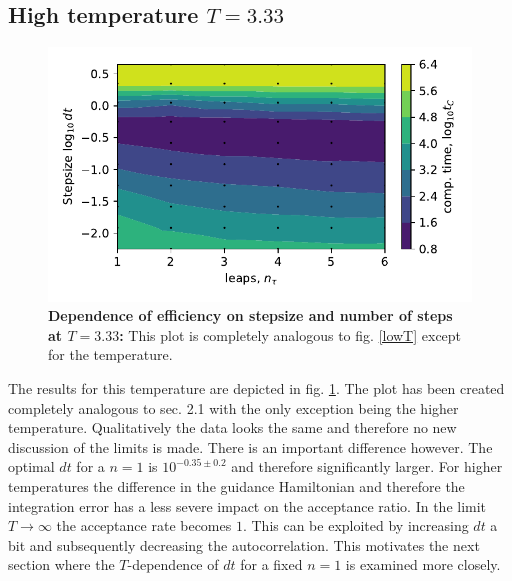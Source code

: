 \documentclass[11pt, a4paper]{scrartcl}
\begin{document}
\subsection{High temperature $T = 3.33$}
    \begin{figure}
    \begin{centering}
        \includegraphics{high_T.pdf}
        \caption{\textbf{Dependence of efficiency on stepsize and number of steps at $T = 3.33$: } This plot is completely analogous to fig. \ref{lowT} except for the temperature.}
    \end{centering}
    \label{highT}
    \end{figure}
    The results for this temperature are depicted in fig. \ref{highT}. The plot has been created completely analogous to sec. 2.1 with the only exception being the higher temperature. Qualitatively the data looks the same and therefore no new discussion of the limits is made. There is an important difference however. The optimal $dt$ for a $n = 1$ is $10^{-0.35 \pm 0.2}$ and therefore significantly larger. For higher temperatures the difference in the guidance Hamiltonian and therefore the integration error has a less severe impact on the acceptance ratio. In the limit $T \rightarrow \infty$ the acceptance rate becomes $1$. This can be exploited by increasing $dt$ a bit and subsequently decreasing the autocorrelation. This motivates the next section where the $T$-dependence of $dt$ for a fixed $n = 1$ is examined more closely.
\end{document}

